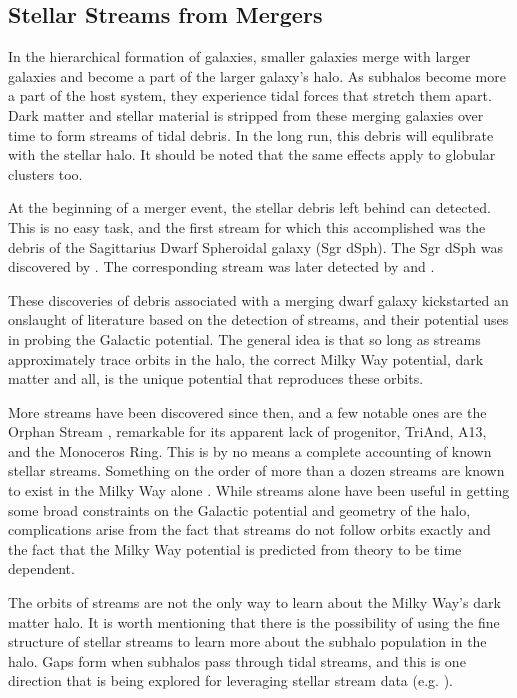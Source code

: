 \subsection{Stellar Streams from Mergers}

In the hierarchical formation of galaxies, smaller galaxies merge with larger galaxies and become a part of the larger galaxy's halo. As subhalos become more a part of the host system, they experience tidal forces that stretch them apart. Dark matter and stellar material is stripped from these merging galaxies over time to form streams of tidal debris. In the long run, this debris will equlibrate with the stellar halo. It should be noted that the same effects apply to globular clusters too.

At the beginning of a merger event, the stellar debris left behind can detected. This is no easy task, and the first stream for which this accomplished was the debris of the Sagittarius Dwarf Spheroidal galaxy (Sgr dSph). The Sgr dSph was discovered by \citet{ibata_discovery}. The corresponding stream was later detected by \citet{newberg_2002} and \citet{majewski_2003}. 

These discoveries of debris associated with a merging dwarf galaxy kickstarted an onslaught of literature based on the detection of streams, and their potential uses in probing the Galactic potential. The general idea is that so long as streams approximately trace orbits in the halo, the correct Milky Way potential, dark matter and all, is the unique potential that reproduces these orbits. 

More streams have been discovered since then, and a few notable ones are the Orphan Stream \citep{grillmair_2006,belokurov_2007,newberg_2010}, remarkable for its apparent lack of progenitor, TriAnd, A13, and the Monoceros Ring. This is by no means a complete accounting of known stellar streams. Something on the order of more than a dozen streams are known to exist in the Milky Way alone \citep{sanders_binney_2013_a}. While streams alone have been useful in getting some broad constraints on the Galactic potential and geometry of the halo, complications arise from the fact that streams do not follow orbits exactly \citet{sanders_binney_2013_a} and the fact that the Milky Way potential is predicted from theory to be time dependent.

The orbits of streams are not the only way to learn about the Milky Way's dark matter halo. It is worth mentioning that there is the possibility of using the fine structure of stellar streams to learn more about the subhalo population in the halo.  Gaps form when subhalos pass through tidal streams, and this is one direction that is being explored for leveraging stellar stream data (e.g. \citet{erkal_2016_stream_gaps}).

